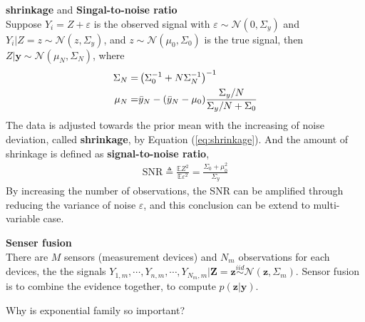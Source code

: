 \begin{example}
    \textbf{shrinkage} and \textbf{Singal-to-noise ratio}\\
    Suppose $Y_i=Z+\varepsilon$ is the observed signal with 
    $\varepsilon\sim\mathcal{N}(0,\Sigma_y)$ and
    $Y_i|Z=z\sim\mathcal{N}(z,\Sigma_y)$,
    and $z\sim\mathcal{N}(\mu_0,\Sigma_0)$ is the true signal, 
    then $Z|\bm{y}\sim\mathcal{N}(\mu_N,\Sigma_N)$, where
    \begin{align}
        \Sigma_N
        =& \left(\Sigma_0^{-1}+N\Sigma_N^{-1}\right)^{-1}\\
        \mu_N
        =& \Bar{y}_N - (\Bar{y}_N-\mu_0)\frac{\Sigma_y/N}{\Sigma_y/N+\Sigma_0} \label{eq:shrinkage}
    \end{align}
    The data is adjusted towards the prior mean with the increasing of noise deviation, called \textbf{shrinkage}, by Equation (\ref{eq:shrinkage}).
    And the amount of shrinkage is defined as \textbf{signal-to-noise ratio}, 
    \begin{gather}
        \text{SNR}\triangleq\frac{\mathbb{E}Z^2}{\mathbb{E}\varepsilon^2}=\frac{\Sigma_0+\mu_0^2}{\Sigma_y}
    \end{gather}
    By increasing the number of observations, 
    the SNR can be amplified through reducing the variance of noise $\varepsilon$, 
    and this conclusion can be extend to multi-variable case.
\end{example}
\begin{example}
    \textbf{Senser fusion}\\
    There are $M$ sensors (measurement devices) and $N_m$ observations for each devices, 
    the the signals $Y_{1,m},\cdots,Y_{n,m},\cdots,Y_{N_m,m}|\bm{Z}=\bm{z}\overset{iid}{\sim}\mathcal{N}(\bm{z},\Sigma_m)$. Sensor fusion is to combine the evidence together, to compute $p(\bm{z}|\bm{y})$.
\end{example}

\begin{question}
    Why is exponential family so important?
\end{question}


